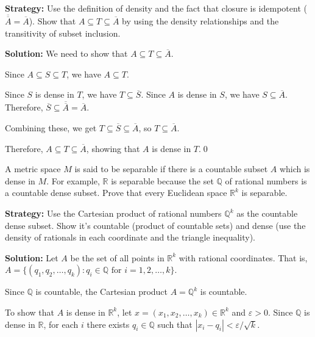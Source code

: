 \noindent\textbf{Strategy:} Use the definition of density and the fact that closure is idempotent ($\overline{\overline{A}} = \overline{A}$). Show that $A \subseteq T \subseteq \overline{A}$ by using the density relationships and the transitivity of subset inclusion.

\bigskip\noindent\textbf{Solution:} We need to show that $A \subseteq T \subseteq \overline{A}$.

Since $A \subseteq S \subseteq T$, we have $A \subseteq T$.

Since $S$ is dense in $T$, we have $T \subseteq \overline{S}$. Since $A$ is dense in $S$, we have $S \subseteq \overline{A}$. Therefore, $\overline{S} \subseteq \overline{\overline{A}} = \overline{A}$.

Combining these, we get $T \subseteq \overline{S} \subseteq \overline{A}$, so $T \subseteq \overline{A}$.

Therefore, $A \subseteq T \subseteq \overline{A}$, showing that $A$ is dense in $T$.\qed


\begin{problembox}
\begin{problemstatement}
A metric space \( M \) is said to be separable if there is a countable subset \( A \) which is dense in \( M \). For example, \( \mathbb{R} \) is separable because the set \( \mathbb{Q} \) of rational numbers is a countable dense subset. Prove that every Euclidean space \( \mathbb{R}^k \) is separable.
\end{problemstatement}
\end{problembox}

\noindent\textbf{Strategy:} Use the Cartesian product of rational numbers $\mathbb{Q}^k$ as the countable dense subset. Show it's countable (product of countable sets) and dense (use the density of rationals in each coordinate and the triangle inequality).

\bigskip\noindent\textbf{Solution:} Let $A$ be the set of all points in $\mathbb{R}^k$ with rational coordinates. That is, $A = \{(q_1, q_2, \ldots, q_k) : q_i \in \mathbb{Q} \text{ for } i = 1,2,\ldots,k\}$.

Since $\mathbb{Q}$ is countable, the Cartesian product $A = \mathbb{Q}^k$ is countable.

To show that $A$ is dense in $\mathbb{R}^k$, let $x = (x_1, x_2, \ldots, x_k) \in \mathbb{R}^k$ and $\varepsilon > 0$. Since $\mathbb{Q}$ is dense in $\mathbb{R}$, for each $i$ there exists $q_i \in \mathbb{Q}$ such that $|x_i - q_i| < \varepsilon/\sqrt{k}$.

